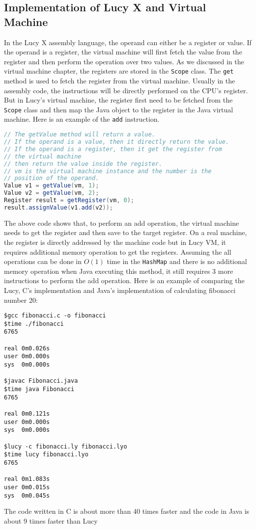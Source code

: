 \subsection{Implementation of Lucy X and Virtual Machine}
In the Lucy X assembly language, the operand can either be a register or value. If the operand is a register, the virtual machine will first fetch the value from the register and then perform the operation over two values. As we discussed in the virtual machine chapter, the registers are stored in the \texttt{Scope} class. The \texttt{get} method is used to fetch the register from the virtual machine. Usually in the assembly code, the instructions will be directly performed on the CPU's register. But in Lucy's virtual machine, the register first need to be fetched from the \texttt{Scope} class and then map the Java object to the register in the Java virtual machine. Here is an example of the \texttt{add} instruction.
\begin{lstlisting}[language=Java]
// The getValue method will return a value.
// If the operand is a value, then it directly return the value.
// If the operand is a register, then it get the register from
// the virtual machine
// then return the value inside the register.
// vm is the virtual machine instance and the number is the
// position of the operand.
Value v1 = getValue(vm, 1);
Value v2 = getValue(vm, 2);
Register result = getRegister(vm, 0);
result.assignValue(v1.add(v2));
\end{lstlisting}
The above code shows that, to perform an add operation, the virtual machine needs to get the register and then save to the target register. On a real machine, the register is directly addressed by the machine code but in Lucy VM, it requires additional memory operation to get the registers. Assuming the all operations can be done in $O(1)$ time in the \texttt{HashMap} and there is no additional memory operation when Java executing this method, it still requires 3 more instructions to perform the add operation. Here is an example of comparing the Lucy, C's implementation and Java's implementation of calculating fibonacci number 20:
\begin{lstlisting}
$gcc fibonacci.c -o fibonacci
$time ./fibonacci
6765

real 0m0.026s
user 0m0.000s
sys  0m0.000s

$javac Fibonacci.java
$time java Fibonacci
6765

real 0m0.121s
user 0m0.000s
sys  0m0.000s

$lucy -c fibonacci.ly fibonacci.lyo
$time lucy fibonacci.lyo
6765

real 0m1.083s
user 0m0.015s
sys  0m0.045s
\end{lstlisting}
The code written in C is about more than 40 times faster and the code in Java is about 9 times faster than Lucy

